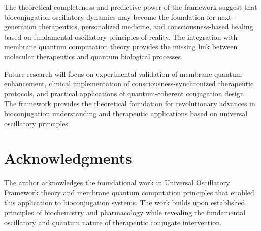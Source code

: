 \documentclass[12pt,a4paper]{article}
\begin{document}
The theoretical completeness and predictive power of the framework suggest that bioconjugation oscillatory dynamics may become the foundation for next-generation therapeutics, personalized medicine, and consciousness-based healing based on fundamental oscillatory principles of reality. The integration with membrane quantum computation theory provides the missing link between molecular therapeutics and quantum biological processes.

Future research will focus on experimental validation of membrane quantum enhancement, clinical implementation of consciousness-synchronized therapeutic protocols, and practical applications of quantum-coherent conjugation design. The framework provides the theoretical foundation for revolutionary advances in bioconjugation understanding and therapeutic applications based on universal oscillatory principles.

\section{Acknowledgments}

The author acknowledges the foundational work in Universal Oscillatory Framework theory and membrane quantum computation principles that enabled this application to bioconjugation systems. The work builds upon established principles of biochemistry and pharmacology while revealing the fundamental oscillatory and quantum nature of therapeutic conjugate intervention.
\end{document}
